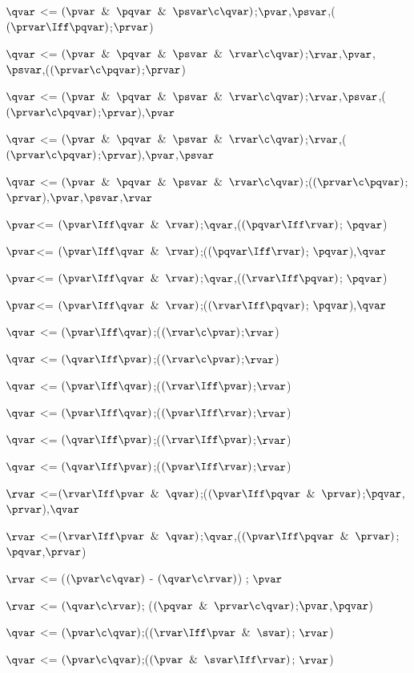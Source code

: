 $\qvar$ <= $(\pvar \And \pqvar \And \psvar\c \qvar)$;$\pvar$,$\psvar$,($(\prvar \Iff \pqvar)$;$\prvar$)

$\qvar$ <= $(\pvar \And \pqvar \And \psvar \And \rvar \c \qvar)$;$\rvar$,$\pvar$,$\psvar$,($(\prvar \c \pqvar)$;$\prvar$)

$\qvar$ <= $(\pvar \And \pqvar \And \psvar \And \rvar \c \qvar)$;$\rvar$,$\psvar$,($(\prvar \c \pqvar)$;$\prvar$),$\pvar$

$\qvar$ <= $(\pvar \And \pqvar \And \psvar \And \rvar \c \qvar)$;$\rvar$,($(\prvar \c \pqvar)$;$\prvar$),$\pvar$,$\psvar$

$\qvar$ <= $(\pvar \And \pqvar \And \psvar \And \rvar \c \qvar)$;($(\prvar \c \pqvar)$;$\prvar$),$\pvar$,$\psvar$,$\rvar$

$\pvar$<= $(\pvar \Iff \qvar \And \rvar)$;$\qvar$,($(\pqvar \Iff \rvar)$; $\pqvar$)

$\pvar$<= $(\pvar \Iff \qvar \And \rvar)$;($(\pqvar \Iff \rvar)$; $\pqvar$),$\qvar$

$\pvar$<= $(\pvar \Iff \qvar \And \rvar)$;$\qvar$,($(\rvar \Iff \pqvar)$; $\pqvar$)

$\pvar$<= $(\pvar \Iff \qvar \And \rvar)$;($(\rvar \Iff \pqvar)$; $\pqvar$),$\qvar$

$\qvar$ <= $(\pvar \Iff \qvar)$;($(\rvar \c \pvar)$;$\rvar$)

$\qvar$ <= $(\qvar \Iff \pvar)$;($(\rvar \c \pvar)$;$\rvar$)

$\qvar$ <= $(\pvar \Iff \qvar)$;($(\rvar \Iff \pvar)$;$\rvar$)

$\qvar$ <= $(\pvar \Iff \qvar)$;($(\pvar \Iff \rvar)$;$\rvar$)

$\qvar$ <= $(\qvar \Iff \pvar)$;($(\rvar \Iff \pvar)$;$\rvar$)

$\qvar$ <= $(\qvar \Iff \pvar)$;($(\pvar \Iff \rvar)$;$\rvar$)

$\rvar $ <=$(\rvar\Iff \pvar \And \qvar)$;($(\pvar \Iff \pqvar \And \prvar)$;$\pqvar$,$\prvar$),$\qvar$

$\rvar $ <=$(\rvar\Iff \pvar \And \qvar)$;$\qvar$,($(\pvar \Iff \pqvar \And \prvar)$;$\pqvar$,$\prvar$)

$\rvar$ <= ($(\pvar \c \qvar)$ - $(\qvar \c \rvar)$) ; $\pvar$

$\rvar$ <= $(\qvar \c \rvar)$; ($(\pqvar \And \prvar \c \qvar)$;$\pvar$,$\pqvar$)

$\qvar$ <= $(\pvar \c \qvar)$;($(\rvar \Iff \pvar \And \svar)$; $\rvar$)

$\qvar$ <= $(\pvar \c \qvar)$;($(\pvar \And \svar\Iff \rvar)$; $\rvar$)

